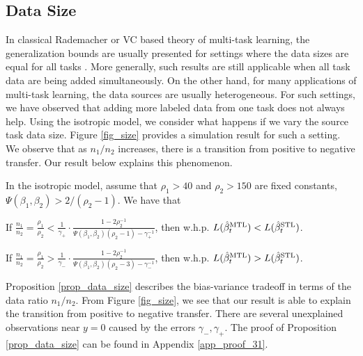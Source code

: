 \subsection{Data Size}
In classical Rademacher or VC based theory of multi-task learning, the generalization bounds are usually presented for settings where the data sizes are equal for all tasks \cite{B00,M06,MPR16}.
More generally, such results are still applicable when all task data are being added simultaneously.
On the other hand, for many applications of multi-task learning, the data sources are usually heterogeneous.
For such settings, we have observed that adding more labeled data from one task does not always help.
Using the isotropic model, we consider what happens if we vary the source task data size.
Figure \ref{fig_size} provides a simulation result for such a setting.
We observe that as $n_1 / n_2$ increases, there is a transition from positive to negative transfer.
Our result below explains this phenomenon.

\begin{proposition}\label{prop_data_size}
	In the isotropic model, assume that $\rho_1 > 40$ and $\rho_2 > 150$ are fixed constants, $\Psi(\beta_1, \beta_2) > 2/(\rho_2 - 1)$.
	We have that
	\squishlist
		\item If $\frac{n_1}{n_2} = \frac{\rho_1}{\rho_2} < \frac{1}{\gamma_+} \cdot \frac{1 - 2\rho_2^{-1}}{\Psi(\beta_1, \beta_2) (\rho_2 - 1) - \gamma_+^{-1}}$, then w.h.p. $L(\hat{\beta}_t^{\text{MTL}}) < L(\hat{\beta}_t^{\text{STL}})$.
		\item If $\frac{n_1}{n_2} = \frac{\rho_1}{\rho_2} > \frac{1}{\gamma_-} \cdot \frac{1 - 2\rho_2^{-1}}{\Psi(\beta_1, \beta_2) (\rho_2 - 3) - \gamma_{-}^{-1}}$, then w.h.p. $L(\hat{\beta}_t^{\text{MTL}}) > L(\hat{\beta}_t^{\text{STL}})$.
	\squishend
\end{proposition}
Proposition \ref{prop_data_size} describes the bias-variance tradeoff in terms of the data ratio $n_1 / n_2$.
From Figure \ref{fig_size}, we see that our result is able to explain the transition from positive to negative transfer.
There are several unexplained observations near $y = 0$ caused by the errors $\gamma_-, \gamma_+$.
The proof of Proposition \ref{prop_data_size} can be found in Appendix \ref{app_proof_31}.

